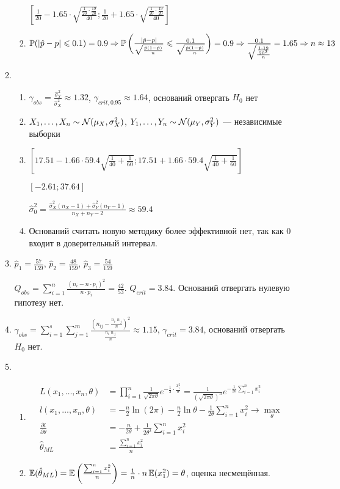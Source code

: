 \begin{enumerate}[resume]
\begin{enumerate}
\begin{enumerate}
$\left[\frac{1}{20} - 1.65 \cdot \sqrt{\frac{\frac{1}{20}\cdot\frac{19}{20}}{40}}; \frac{1}{20} + 1.65 \cdot \sqrt{\frac{\frac{1}{20}\cdot\frac{19}{20}}{40}}  \right]$
\item $\P(\vert \hat{p} - p \vert \leq 0.1) = 0.9 \Rightarrow \P\left(\frac{\vert \hat{p} - p \vert}{\sqrt{\frac{\hat{p}(1-\hat{p})}{n}}} \leq \frac{0.1}{\sqrt{\frac{\hat{p}(1-\hat{p})}{n}}} \right) = 0.9 \Rightarrow \frac{0.1}{\sqrt{\frac{\frac{1\cdot19}{20^2}}{n}}} = 1.65 \Rightarrow n \approx 13$
\end{enumerate}
\item
\begin{enumerate}
\item $\gamma_{obs} = \frac{\hat{\sigma}^2_Y}{\hat{\sigma}^2_X} \approx 1.32$, $\gamma_{crit, 0.95} \approx 1.64$,
оснований отвергать $H_0$ нет
\item $X_1, \ldots, X_n \sim \cN(\mu_X, \sigma^2_X)$, $Y_1, \ldots, Y_n \sim \cN(\mu_Y, \sigma^2_Y)$ — независимые выборки
\item $\left[17.51 - 1.66 \cdot 59.4 \sqrt{\frac{1}{40}+ \frac{1}{60}}; 17.51 + 1.66 \cdot 59.4 \sqrt{\frac{1}{40}+ \frac{1}{60}} \right]$

$[-2.61; 37.64]$

$\hat{\sigma}_0^2 = \frac{\hat{\sigma}^2_X(n_X-1) + \hat{\sigma}^2_Y(n_Y-1)}{n_X+n_Y-2} \approx 59.4$
\item Оснований считать новую методику более эффективной нет, так как $0$ входит в доверительный интервал.
\end{enumerate}
\item $\hat{p}_1 = \frac{57}{159}$, $\hat{p}_2 = \frac{48}{159}$, $\hat{p}_3 = \frac{54}{159}$

$Q_{obs} = \sum_{i=1}^n \frac{(n_i - n \cdot p_i)^2}{n \cdot p_i} = \frac{42}{53}$. $Q_{crit} = 3.84$.
Оснований отвергать нулевую гипотезу нет.
\item $\gamma_{obs} = \sum_{i=1}^s \sum_{j=1}^m \frac{\left(n_{ij} - \frac{n_{i\cdot}n_{\cdot j}}{n}\right)^2}{\frac{n_{i\cdot}n_{\cdot j}}{n}} \approx 1.15$,
$\gamma_{crit} = 3.84$, оснований отвергать $H_0$ нет.
\item
\begin{enumerate}
\item \begin{align*}
L(x_1, \ldots, x_n, \theta) &= \prod_{i=1}^n \frac{1}{\sqrt{2\pi\theta}}e^{-\frac{1}{2}\cdot\frac{x_i^2}{\theta}} = \frac{1}{(\sqrt{2\pi\theta})^n} e^{-\frac{1}{2\theta} \sum_{i=1}^n x_i^2} \\
l(x_1, \ldots, x_n, \theta) &= -\frac{n}{2} \ln (2\pi) - \frac{n}{2} \ln \theta -\frac{1}{2\theta} \sum_{i=1}^n x_i^2 \to \max_{\theta} \\
\frac{\partial l}{\partial \theta} &= - \frac{n}{2 \theta} + \frac{1}{2\theta^2} \sum_{i=1}^n x_i^2 \\
\hat{\theta}_{ML} &= \frac{\sum_{i=1}^n x_i^2}{n}
\end{align*}
\item $\E(\hat{\theta}_{ML}) = \E\left(\frac{\sum_{i=1}^n x_i^2}{n}\right) = \frac{1}{n}\cdot n \E(x_1^2) = \theta$,
оценка несмещённая.


\end{enumerate}
\end{enumerate}
\end{enumerate}
